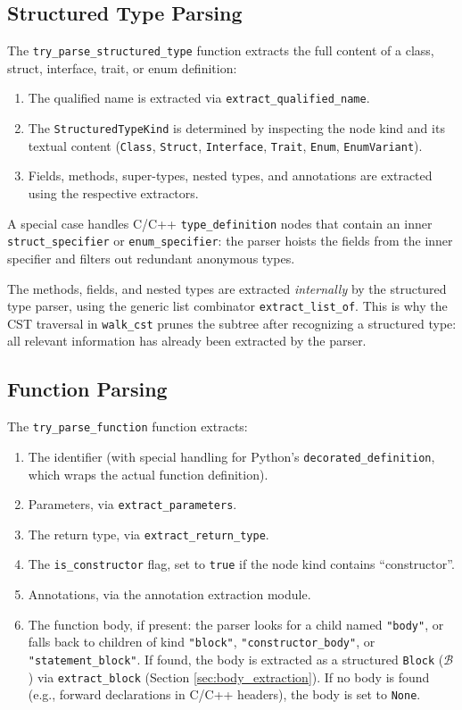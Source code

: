 \subsection{Structured Type Parsing}

The \texttt{try\_parse\_structured\_type} function extracts the full
content of a class, struct, interface, trait, or enum definition:
\begin{enumerate}
  \item The qualified name is extracted via \texttt{extract\_qualified\_name}.
  \item The \texttt{StructuredTypeKind} is determined by inspecting
    the node kind and its textual content (\texttt{Class},
      \texttt{Struct}, \texttt{Interface}, \texttt{Trait},
    \texttt{Enum}, \texttt{EnumVariant}).
  \item Fields, methods, super-types, nested types, and annotations
    are extracted using the respective extractors.
\end{enumerate}

A special case handles C/C++ \texttt{type\_definition} nodes that
contain an inner \texttt{struct\_specifier} or
\texttt{enum\_specifier}: the parser hoists the fields from the inner
specifier and filters out redundant anonymous types.

The methods, fields, and nested types are extracted
\textit{internally} by the structured type parser, using the generic
list combinator \texttt{extract\_list\_of}. This is why the CST
traversal in \texttt{walk\_cst} prunes the subtree after recognizing
a structured type: all relevant information has already been
extracted by the parser.

\subsection{Function Parsing}

The \texttt{try\_parse\_function} function extracts:
\begin{enumerate}
  \item The identifier (with special handling for Python's
    \texttt{decorated\_definition}, which wraps the actual function definition).
  \item Parameters, via \texttt{extract\_parameters}.
  \item The return type, via \texttt{extract\_return\_type}.
  \item The \texttt{is\_constructor} flag, set to \texttt{true} if
    the node kind contains ``constructor''.
  \item Annotations, via the annotation extraction module.
  \item The function body, if present: the parser looks for a child
    named \texttt{"body"}, or falls back to children of kind
    \texttt{"block"}, \texttt{"constructor\_body"}, or
    \texttt{"statement\_block"}. If found, the body is extracted as a
    structured \texttt{Block} ($\mathcal{B}$) via
    \texttt{extract\_block} (Section \ref{sec:body_extraction}). If
    no body is found (e.g., forward declarations in C/C++ headers),
    the body is set to \texttt{None}.
\end{enumerate}

